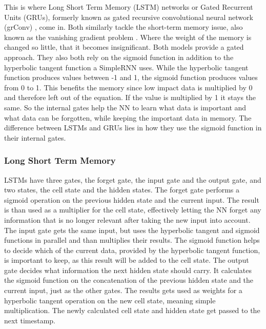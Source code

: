 \documentclass[
	ngerman,
	ruledheaders=section,%
	class=report,%
	thesis={type=bachelor},%
	accentcolor=9c,%
	custommargins=true,%
	marginpar=false,%
	parskip=half-,%
	fontsize=11pt,%
]{tudapub}
\begin{document}
This is where Long Short Term Memory (LSTM) networks \cite{hochreiterLongShortTermMemory1997} or Gated Recurrent Units (GRUs), formerly known as gated recursive convolutional neural network (grConv) \cite{bahdanauNeuralMachineTranslation2016}, come in.
Both similarly tackle the short-term memory issue,
also known as the vanishing gradient problem \cite{hochreiterLongShortTermMemory1997}.
Where the weight of the memory is changed so little, that it becomes insignificant.
Both models provide a gated approach.
They also both rely on the sigmoid function in addition to the hyperbolic tangent function a SimpleRNN uses.
While the hyperbolic tangent function produces values between -1 and 1,
the sigmoid function produces values from 0 to 1.
This benefits the memory since low impact data is multiplied by 0 and therefore left out of the equation.
If the value is multiplied by 1 it stays the same.
So the internal gates help the NN to learn what data is important and what data can be forgotten, while keeping the important data in memory.
The difference between LSTMs and GRUs lies in how they use the sigmoid function in their internal gates.

\subsubsection{Long Short Term Memory}

LSTMs have three gates, the forget gate, the input gate and the output gate, and two states, the cell state and the hidden states. \cite{phiIllustratedGuideLSTM2020}
The forget gate performs a sigmoid operation on the previous hidden state and the current input.
The result is than used as a multiplier for the cell state, effectively letting the NN forget any information that is no longer relevant after taking the new input into account.
The input gate gets the same input, but uses the hyperbolic tangent and sigmoid functions in parallel and than multiplies their results.
The sigmoid function helps to decide which of the current data, provided by the hyperbolic tangent function, is important to keep, as this result will be added to the cell state.
The output gate decides what information the next hidden state should carry.
It calculates the sigmoid function on the concatenation of the previous hidden state and the current input, just as the other gates.
The results gets used as weights for a hyperbolic tangent operation on the new cell state, meaning simple multiplication.
The newly calculated cell state and hidden state get passed to the next timestamp.
\end{document}
